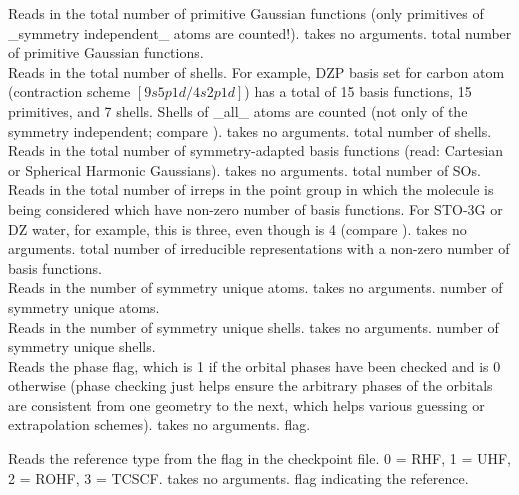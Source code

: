 \noindent {}
{Reads in the total number of primitive Gaussian functions 
(only primitives of \_symmetry independent\_ atoms are counted!).}
{takes no arguments.}
{total number of primitive Gaussian functions.} \\

\noindent {}
{Reads in the total number of shells. For example, DZP basis set for 
carbon atom (contraction scheme $[9s5p1d/4s2p1d]$) has a total of 15 basis 
functions, 15 primitives, and 7 shells. Shells of \_all\_ atoms are counted
(not only of the symmetry independent; compare ).}
{takes no arguments.}
{total number of shells.} \\

\noindent {}
{Reads in the total number of symmetry-adapted basis functions (read:
Cartesian or Spherical Harmonic Gaussians).}
{takes no arguments.}
{total number of SOs.} \\

\noindent {}
{Reads in the total number of irreps
in the point group in which the molecule is being considered which
have non-zero number of basis functions. For STO-3G or DZ water, for
example, this is three, even though  is 4 (compare
).}
{takes no arguments.}
{total number of irreducible representations
with a non-zero number of basis functions.} \\

\noindent {}
{Reads in the number of symmetry unique atoms.}
{takes no arguments.}
{number of symmetry unique atoms.} \\

\noindent {}
{Reads in the number of symmetry unique shells.}
{takes no arguments.}
{number of symmetry unique shells.} \\

\noindent {}
{Reads the phase flag, which is 1 if the orbital phases have been checked
and is 0 otherwise (phase checking just helps ensure the arbitrary phases
of the orbitals are consistent from one geometry to the next, which helps
various guessing or extrapolation schemes).}
{takes no arguments.}
{flag.}

\noindent {}
{Reads the reference type from the flag in the checkpoint file.
0 = RHF, 1 = UHF, 2 = ROHF, 3 = TCSCF.}
{takes no arguments.}
{flag indicating the reference.}

